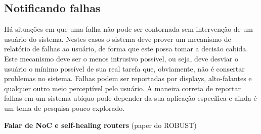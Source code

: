 
\subsection{Notificando falhas} %
\label{sub:notificando_falhas}

Há situações em que uma falha não pode ser contornada sem intervenção de um usuário do sistema. Nestes casos o sistema deve prover um mecanismo de relatório de falhas ao usuário, de forma que este possa tomar a decisão cabida. Este mecanismo deve ser o menos intrusivo possível, ou seja, deve desviar o usuário o mínimo possível de sua real tarefa que, obviamente, não é consertar problemas no sistema. Falhas podem ser reportadas por displays, alto-falantes e qualquer outro meio perceptível pelo usuário. A maneira correta de reportar falhas em um sistema ubíquo pode depender da sua aplicação específica e ainda é um tema de pesquisa pouco explorado.


\textbf{Falar de NoC e self-healing routers} (paper do ROBUST)
